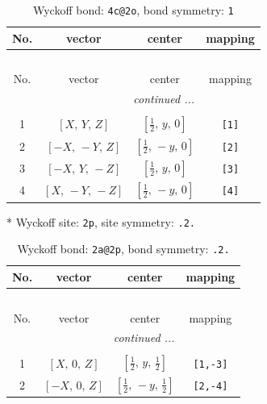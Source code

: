 \documentclass[fleqn,8pt]{jsarticle}
\begin{document}
\begin{longtable}{cccc}
\caption{Wyckoff bond: {\tt 4c@2o}, bond symmetry: {\tt 1}}
 \\
 \hline \hline
No. & vector & center & mapping \\ \hline \endfirsthead

\multicolumn{3}{l}{\tablename\ \thetable{}} \\
 \hline \hline
No. & vector & center & mapping \\ \hline \endhead

 \hline \hline
\multicolumn{3}{r}{\footnotesize\it continued ...} \\ \endfoot

 \hline \hline
\multicolumn{3}{r}{} \\ \endlastfoot

1 & $\left[ X,\, Y,\, Z \right]$ & $\left[ \frac{1}{2},\, y,\, 0 \right]$ & {\tt [1]} \\ \hline
2 & $\left[ - X,\, - Y,\, Z \right]$ & $\left[ \frac{1}{2},\, - y,\, 0 \right]$ & {\tt [2]} \\ \hline
3 & $\left[ - X,\, Y,\, - Z \right]$ & $\left[ \frac{1}{2},\, y,\, 0 \right]$ & {\tt [3]} \\ \hline
4 & $\left[ X,\, - Y,\, - Z \right]$ & $\left[ \frac{1}{2},\, - y,\, 0 \right]$ & {\tt [4]} \\
\end{longtable}
* Wyckoff site: {\tt 2p}, site symmetry: {\tt .2.}
\renewcommand{\arraystretch}{1.2}
\begin{longtable}{cccc}
\caption{Wyckoff bond: {\tt 2a@2p}, bond symmetry: {\tt .2.}}
 \\
 \hline \hline
No. & vector & center & mapping \\ \hline \endfirsthead

\multicolumn{3}{l}{\tablename\ \thetable{}} \\
 \hline \hline
No. & vector & center & mapping \\ \hline \endhead

 \hline \hline
\multicolumn{3}{r}{\footnotesize\it continued ...} \\ \endfoot

 \hline \hline
\multicolumn{3}{r}{} \\ \endlastfoot

1 & $\left[ X,\, 0,\, Z \right]$ & $\left[ \frac{1}{2},\, y,\, \frac{1}{2} \right]$ & {\tt [1,-3]} \\ \hline
2 & $\left[ - X,\, 0,\, Z \right]$ & $\left[ \frac{1}{2},\, - y,\, \frac{1}{2} \right]$ & {\tt [2,-4]} \\
\end{longtable}
\end{document}
